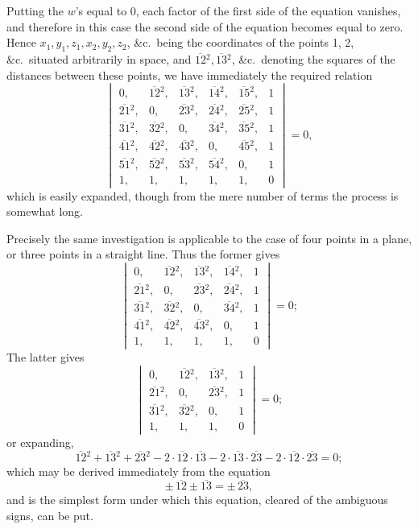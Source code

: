\documentclass[11pt]{article}
\begin{document}
Putting the $w$'s equal to 0, each factor of the first side of the equation vanishes, and therefore in this case the second side of the equation becomes equal to zero. Hence $x_1, y_1, z_1, x_2, y_2, z_2$, \&c.\ being the coordinates of the points 1, 2, \&c.\ situated arbitrarily in space, and $\overline{12}{}^2, \overline{13}{}^2$, \&c.\ denoting the squares of the distances between these points, we have immediately the required relation
\[
\begin{vmatrix}
0, & \overline{12}{}^2, & \overline{13}{}^2, & \overline{14}{}^2, & \overline{15}{}^2, & 1 \\
\overline{21}{}^2, & 0, & \overline{23}{}^2, & \overline{24}{}^2, & \overline{25}{}^2, & 1 \\
\overline{31}{}^2, & \overline{32}{}^2, & 0, & \overline{34}{}^2, & \overline{35}{}^2, & 1 \\
\overline{41}{}^2, & \overline{42}{}^2, & \overline{43}{}^2, & 0, & \overline{45}{}^2, & 1 \\
\overline{51}{}^2, & \overline{52}{}^2, & \overline{53}{}^2, & \overline{54}{}^2, & 0, & 1 \\
1, & 1, & 1, & 1, & 1, & 0
\end{vmatrix} = 0,
\]
which is easily expanded, though from the mere number of terms the process is somewhat long.

Precisely the same investigation is applicable to the case of four points in a plane, or three points in a straight line. Thus the former gives
\[
\begin{vmatrix}
0, & \overline{12}{}^2, & \overline{13}{}^2, & \overline{14}{}^2, & 1 \\
\overline{21}{}^2, & 0, & \overline{23}{}^2, & \overline{24}{}^2, & 1 \\
\overline{31}{}^2, & \overline{32}{}^2, & 0, & \overline{34}{}^2, & 1 \\
\overline{41}{}^2, & \overline{42}{}^2, & \overline{43}{}^2, & 0, & 1 \\
1, & 1, & 1, & 1, & 0
\end{vmatrix} = 0;
\]
The latter gives
\[
\begin{vmatrix}
0, & \overline{12}{}^2, & \overline{13}{}^2, & 1 \\
\overline{21}{}^2, & 0, & \overline{23}{}^2, & 1 \\
\overline{31}{}^2, & \overline{32}{}^2, & 0, & 1 \\
1, & 1, & 1, & 0
\end{vmatrix} = 0;
\]
or expanding,
\[
\overline{12}{}^2 + \overline{13}{}^2 + \overline{23}{}^2 - 2\cdot\overline{12}\cdot\overline{13} - 2\cdot\overline{13}\cdot\overline{23} - 2\cdot\overline{12}\cdot\overline{23} = 0;
\]
which may be derived immediately from the equation
\[
\pm\,\overline{12} \pm \overline{13} = \pm\,\overline{23},
\]
and is the simplest form under which this equation, cleared of the ambiguous signs, can be put.
\end{document}
